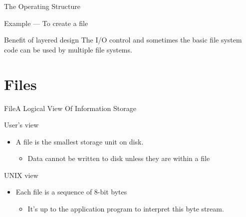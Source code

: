 \begin{frame}{The Operating Structure}
\begin{varwidth}{.7\textwidth}
\begin{block}{Example --- To create a file}
\begin{enumerate}
\begin{enumerate}
        \end{enumerate}
      \end{enumerate}
    \end{block}
  \end{varwidth}
  \begin{block}{Benefit of layered design}
    The I/O control and sometimes the basic file system code can be used by multiple file
    systems.
  \end{block}
\end{frame}

\section{Files}

\begin{frame}{File}{A Logical View Of Information Storage}
  \begin{block}{User's view}
    \begin{itemize}
    \item[] A file is the smallest storage unit on disk.
      \begin{itemize}
      \item Data cannot be written to disk unless they are within a file
      \end{itemize}
    \end{itemize}
  \end{block}
  \begin{block}{UNIX view}
    \begin{itemize}
    \item[] Each file is a sequence of 8-bit bytes
      \begin{itemize}
      \item It's up to the application program to interpret this byte stream.
      \end{itemize}
    \end{itemize}
  \end{block}
\end{frame}

